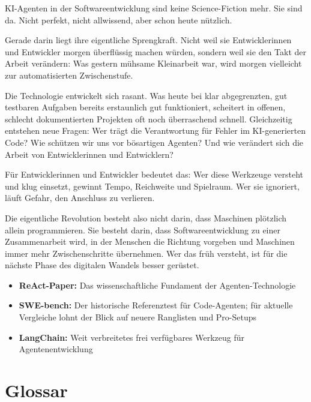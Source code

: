 KI-Agenten in der Softwareentwicklung sind keine Science-Fiction mehr. Sie sind da. Nicht perfekt, nicht allwissend, aber schon heute nützlich.

Gerade darin liegt ihre eigentliche Sprengkraft. Nicht weil sie Entwicklerinnen und Entwickler morgen überflüssig machen würden, sondern weil sie den Takt der Arbeit verändern: Was gestern mühsame Kleinarbeit war, wird morgen vielleicht zur automatisierten Zwischenstufe.

Die Technologie entwickelt sich rasant. Was heute bei klar abgegrenzten, gut testbaren Aufgaben bereits erstaunlich gut funktioniert, scheitert in offenen, schlecht dokumentierten Projekten oft noch überraschend schnell. Gleichzeitig entstehen neue Fragen: Wer trägt die Verantwortung für Fehler im KI-generierten Code? Wie schützen wir uns vor bösartigen Agenten? Und wie verändert sich die Arbeit von Entwicklerinnen und Entwicklern?

Für Entwicklerinnen und Entwickler bedeutet das: Wer diese Werkzeuge versteht und klug einsetzt, gewinnt Tempo, Reichweite und Spielraum. Wer sie ignoriert, läuft Gefahr, den Anschluss zu verlieren.

Die eigentliche Revolution besteht also nicht darin, dass Maschinen plötzlich allein programmieren. Sie besteht darin, dass Softwareentwicklung zu einer Zusammenarbeit wird, in der Menschen die Richtung vorgeben und Maschinen immer mehr Zwischenschritte übernehmen. Wer das früh versteht, ist für die nächste Phase des digitalen Wandels besser gerüstet.

\begin{infobox}
\begin{itemize}
  \item \textbf{ReAct-Paper:} Das wissenschaftliche Fundament der Agenten-Technologie~\cite{yao2023react}
  \item \textbf{SWE-bench:} Der historische Referenztest für Code-Agenten; für aktuelle Vergleiche lohnt der Blick auf neuere Ranglisten und Pro-Setups~\cite{jimenez2023swe,swebench2026leaderboard,openai2026swebenchverified}
  \item \textbf{LangChain:} Weit verbreitetes frei verfügbares Werkzeug für Agentenentwicklung~\cite{chase2023langchain}
\end{itemize}
\end{infobox}


\section*{Glossar}


